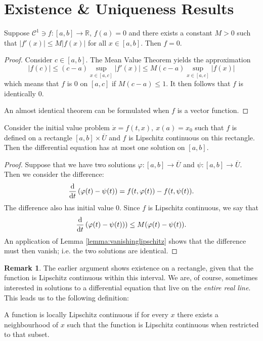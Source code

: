 \documentclass[prb,12pt]{revtex4-2}
\theoremstyle{definition}
\newtheorem{Remark}[Theorem]{Remark}
\theoremstyle{definition}
\theoremstyle{definition}
\newcommand{\R}{\mathbb{R}}
\begin{document}
	\section{Existence \& Uniqueness Results}
	\begin{Lemma}\label{lemma:vanishinglipschitz}
		Suppose $\mathcal{C}^1\ni f:[a,b]\to \R$, $f(a)=0$ and there exists a constant $M>0$ such that $|f'(x)|\le M |f(x)|$ for all $x\in [a,b]$. Then $f=0$.
	\end{Lemma}
	\begin{proof}
		Consider $c\in [a,b]$. The Mean Value Theorem yields the approximation
		\[|f(c)|\le (c-a)\sup_{x\in [a,c]}|f'(x)|\le M(c-a)\sup_{x\in [a,c]}|f(x)|\]
		which means that $f$ is $0$ on $[a,c]$ if $M(c-a)\le 1$. It then follows that $f$ is identically $0$.
		
		An almost identical theorem can be formulated when $f$ is a vector function.
	\end{proof}
	\begin{Theorem}[Uniqueness]\label{thm:uniqueness}
		Consider the initial value problem $\dot{x}=f(t, x),~x(a)=x_0$ such that $f$ is defined on a rectangle $[a,b]\times \overline{U}$ and $f$ is Lipschitz continuous on this rectangle. Then the differential equation has at most one solution on $[a,b]$.
	\end{Theorem}
	\begin{proof}
		Suppose that we have two solutions $\varphi: [a,b] \to \overline{U}$ and $\psi: [a,b]\to \overline{U}$. Then we consider the difference:
		 \[\dv{t}\left(\varphi(t)-\psi(t)\right) = f(t, \varphi(t))-f(t,\psi(t)).\]
		 The difference also has initial value $0$. Since $f$ is Lipschitz continuous, we say that
		 \[\dv{t}\left( \varphi(t) - \psi(t)\right)) \le M(\varphi(t)-\psi(t)).\]
		 An application of Lemma \ref{lemma:vanishinglipschitz} shows that the difference must then vanish; i.e. the two solutions are identical.
	\end{proof}
	\begin{Remark}
		The earlier argument shows existence on a rectangle, given that the function is Lipschitz continuous within this interval. We are, of course, sometimes interested in solutions to a differential equation that live on the \emph{entire real line}. This leads us to the following definition:
	\end{Remark}
	\begin{Definition}
		A function is locally Lipschitz continuous if for every $x$ there exists a neighbourhood of $x$ such that the function is Lipschitz continuous when restricted to that subset.
	\end{Definition}
\end{document}
